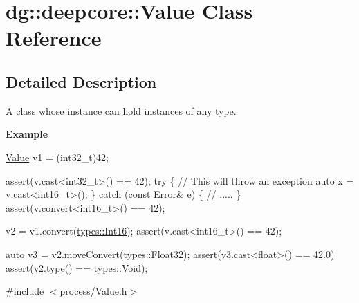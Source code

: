 \hypertarget{classdg_1_1deepcore_1_1_value}{}\section{dg\+:\+:deepcore\+:\+:Value Class Reference}
\label{classdg_1_1deepcore_1_1_value}


\subsection{Detailed Description}
A class whose instance can hold instances of any type. 

{\bfseries Example}


\begin{DoxyCode}
\hyperlink{classdg_1_1deepcore_1_1_value_aa4f1ef5b6a16fa851cd06253f6ffef2c}{Value} v1 = (int32\_t)42;

assert(v.cast<int32\_t>() == 42);
\textcolor{keywordflow}{try} \{
    \textcolor{comment}{// This will throw an exception}
    \textcolor{keyword}{auto} x = v.cast<int16\_t>();
\} \textcolor{keywordflow}{catch} (\textcolor{keyword}{const} Error& e) \{
    \textcolor{comment}{// .....}
\}
assert(v.convert<int16\_t>() == 42);

v2 = v1.convert(\hyperlink{group___process_attributes_gac2aeb0ab4afb8e7b231b95d178940f57}{types::Int16});
assert(v.cast<int16\_t>() == 42);

\textcolor{keyword}{auto} v3 = v2.moveConvert(\hyperlink{group___process_attributes_ga61b8924d2ea1e93844df63eab076eccc}{types::Float32});
assert(v3.cast<\textcolor{keywordtype}{float}>() == 42.0)
assert(v2.\hyperlink{classdg_1_1deepcore_1_1_value_abbcca617f78f66202f6ec22967338dcf}{type}() == types::Void);
\end{DoxyCode}
 

{\ttfamily \#include $<$process/\+Value.\+h$>$}

